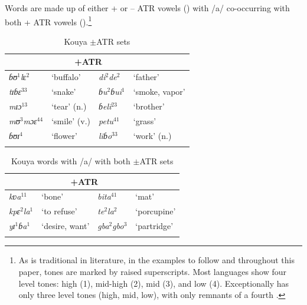 \documentclass[output=paper,newtxmath,modfonts,nonflat,draft]{langsci/langscibook}
\begin{document}
 Words are made up of either + or – ATR vowels () with /a/ co-occurring with both + ATR vowels ().\footnote{As is traditional in  literature, in the examples to follow and throughout this paper, tones are marked by raised superscripts. Most  languages show four level tones: high (1), mid-high (2), mid (3), and low (4).  Exceptionally  has only three level tones (high, mid, low), with only remnants of a fourth  \citep{Gratrix1975}.} 

\begin{table}

\caption{Kouya $\pm$ATR sets}     \label{tab:zogbo:2a}
\begin{tabular}{llll}

\lsptoprule
\multicolumn{2}{c}{−ATR} & \multicolumn{2}{c}{+ATR}\\
\midrule
\textit{ɓʊ}{$^1$}\textit{l}ɛ$^2$ &     {‘buffalo’} & \textit{di}$^2$\textit{de}$^2$ & {‘father’}\\

\textit{tɪɓɛ}$^{33}$  &  ‘snake’   &   \textit{ɓu}$^2$\textit{ɓui}$^1$ & {‘smoke,  vapor’}\\

\textit{mɪɔ}$^{13}$  &  ‘tear’ (n.) &    \textit{ɓeli}$^{23}$  &  ‘brother’ \\

\textit{m{ʊ}}{$^3$}\textit{{m}ɔɛ}$^{44}$ & ‘smile’ (v.)  &  \textit{petu}$^{41}$  &  ‘grass’ \\

\textit{ɓʊɪ}$^4$ & ‘flower’  &  \textit{liɓo}$^{33}$    & ‘work’ (n.) \\
\lspbottomrule
\end{tabular}
\end{table}

\begin{table}
\caption{Kouya words with /a/ with both $\pm$ATR sets}
\label{tab:zogbo:2b}
  
\begin{tabular}{llll}

\lsptoprule
\multicolumn{2}{c}{−ATR} & \multicolumn{2}{c}{+ATR} \\
\midrule
\textit{kʋa}$^{11}$ & ‘bone’ & \textit{bita}$^{41}$ & ‘mat’ \\

\textit{{kp}ɛ}$^2$\textit{{l}a}$^1$ & {‘to refuse’} & \textit{te}$^2$\textit{la}$^2$ & ‘porcupine’ \\

\textit{yɪ}$^1$\textit{ɓa}$^1$ & ‘desire, want’ & \textit{gba}$^2$\textit{gbo}$^3$ & ‘partridge’ \\ 
\lspbottomrule
\end{tabular}
\end{table}
\end{document}
